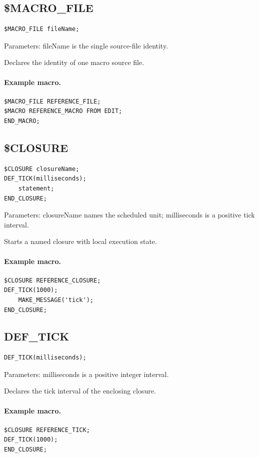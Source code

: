 \documentclass[a4paper,10pt,twoside,openany]{book}
\newenvironment{mrmacextension}{\begin{changebar}}{\end{changebar}}
\begin{document}
\label{prim:keyword-dollar-macro-file}
\subsection*{\$MACRO\_FILE}
\begin{verbatim}
$MACRO_FILE fileName;
\end{verbatim}
Parameters: fileName is the single source-file identity.

Declares the identity of one macro source file.

\paragraph{Example macro.}
\begin{verbatim}
$MACRO_FILE REFERENCE_FILE;
$MACRO REFERENCE_MACRO FROM EDIT;
END_MACRO;
\end{verbatim}

\begin{mrmacextension}
\label{prim:keyword-dollar-closure}
\subsection*{\$CLOSURE}
\begin{verbatim}
$CLOSURE closureName;
DEF_TICK(milliseconds);
    statement;
END_CLOSURE;
\end{verbatim}
Parameters: closureName names the scheduled unit; milliseconds is a positive tick interval.

Starts a named closure with local execution state.

\paragraph{Example macro.}
\begin{verbatim}
$CLOSURE REFERENCE_CLOSURE;
DEF_TICK(1000);
    MAKE_MESSAGE('tick');
END_CLOSURE;
\end{verbatim}
\end{mrmacextension}

\begin{mrmacextension}
\label{prim:keyword-def-tick}
\subsection*{DEF\_TICK}
\begin{verbatim}
DEF_TICK(milliseconds);
\end{verbatim}
Parameters: milliseconds is a positive integer interval.

Declares the tick interval of the enclosing closure.

\paragraph{Example macro.}
\begin{verbatim}
$CLOSURE REFERENCE_TICK;
DEF_TICK(1000);
END_CLOSURE;
\end{verbatim}
\end{mrmacextension}
\end{document}
